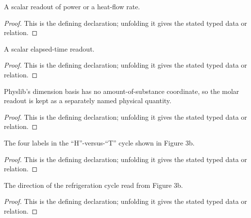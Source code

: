 \begin{definition}[PowerReadout]
  \label{decl:physics:IPhO_2026_3_C_4:PowerReadout}
  A scalar readout of power or a heat-flow rate.
\end{definition}
\begin{proof}
  This is the defining declaration; unfolding it gives the stated typed data or relation.
\end{proof}

\begin{definition}[TimeReadout]
  \label{decl:physics:IPhO_2026_3_C_4:TimeReadout}
  A scalar elapsed-time readout.
\end{definition}
\begin{proof}
  This is the defining declaration; unfolding it gives the stated typed data or relation.
\end{proof}

\begin{definition}[AmountOfSubstanceReadout]
  \label{decl:physics:IPhO_2026_3_C_4:AmountOfSubstanceReadout}
  Physlib's dimension basis has no amount-of-substance coordinate, so the molar readout is kept as a separately named physical quantity.
\end{definition}
\begin{proof}
  This is the defining declaration; unfolding it gives the stated typed data or relation.
\end{proof}

\begin{definition}[CyclePoint]
  \label{decl:physics:IPhO_2026_3_C_4:CyclePoint}
  The four labels in the “H”-versus-“T” cycle shown in Figure 3b.
\end{definition}
\begin{proof}
  This is the defining declaration; unfolding it gives the stated typed data or relation.
\end{proof}

\begin{definition}[refrigerationCycleOrder]
  \label{decl:physics:IPhO_2026_3_C_4:refrigerationCycleOrder}
  The direction of the refrigeration cycle read from Figure 3b.
\end{definition}
\begin{proof}
  This is the defining declaration; unfolding it gives the stated typed data or relation.
\end{proof}

